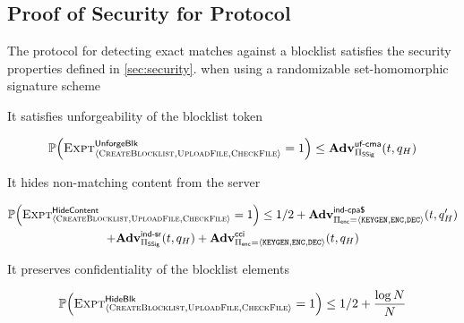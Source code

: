 
\iffalse 
\subsection{Proof of Security for Protocol \protocolEM}
\label{sec:proof:em}
%


\begin{theorem}
	\label{thm:proof:em}
	The protocol \protocolEM for detecting exact matches against a blocklist satisfies the security properties defined in \ref{sec:security}.
when using a randomizable set-homomorphic signature scheme \ourSigSchemeDefn 
	

	\enumListStart
	
	\item It satisfies unforgeability of the blocklist token 
	\begin{small}
	\begin{gather*}
    \mathbb{P}\mathopen{}\left({\textsc{Expt}^{\mathsf{UnforgeBlk}}_{\langle \textsc{CreateBlocklist}, \textsc{UploadFile}, \textsc{CheckFile} \rangle} = 1}\right)\mathclose{} \le \mathbf{Adv}^{\scriptsize\textsf{uf-cma}}_{\Pi_{\mathsf{SSig}} }(t, q_H)
\end{gather*}
	\end{small}
	
	\item It hides non-matching content from the server 
	
	\begin{small}
					\begin{gather*}
			\prob{\hidingContentExp = 1} \le 1/2 + \Advantage{\indcpaRandLabel}{\encryptionSchemeDefn}(\timeBound, 
		\oracleQueries') \\  + \indsrAdv +  \Advantage{\cciLabel}{\encryptionSchemeDefn}(\timeBound, \oracleQueries) 
		\end{gather*}
		\end{small}
	
	\item It preserves confidentiality of the blocklist elements
	
	\begin{small}
				\begin{gather*}
				\mathbb{P}\mathopen{}\left({\textsc{Expt}^{\mathsf{HideBlk}}_{\langle \textsc{CreateBlocklist}, \textsc{UploadFile}, \textsc{CheckFile} \rangle} = 1}\right)\mathclose{} \le 1/2 + \frac{\log N}{N}
			\end{gather*}
		\end{small}
	
	\enumListEnd  
\end{theorem}


